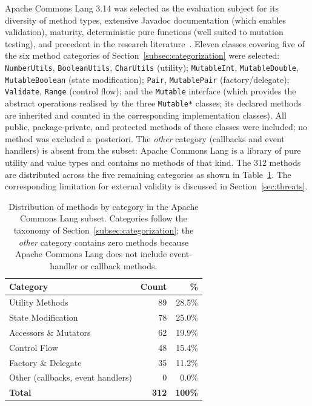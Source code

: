 \documentclass[11pt]{article}
\begin{document}
Apache Commons Lang 3.14 was selected as the evaluation subject for its diversity of method types, extensive Javadoc documentation (which enables validation), maturity, deterministic pure functions (well suited to mutation testing), and precedent in the research literature~\cite{pacheco2007randoop, fraser2011evosuite}. Eleven classes covering five of the six method categories of Section~\ref{subsec:categorization} were selected: \texttt{NumberUtils}, \texttt{BooleanUtils}, \texttt{CharUtils} (utility); \texttt{MutableInt}, \texttt{MutableDouble}, \texttt{MutableBoolean} (state modification); \texttt{Pair}, \texttt{MutablePair} (factory/delegate); \texttt{Validate}, \texttt{Range} (control flow); and the \texttt{Mutable} interface (which provides the abstract operations realised by the three \texttt{Mutable*} classes; its declared methods are inherited and counted in the corresponding implementation classes). All public, package-private, and protected methods of these classes were included; no method was excluded a~posteriori. The \emph{other} category (callbacks and event handlers) is absent from the subset: Apache Commons Lang is a library of pure utility and value types and contains no methods of that kind. The 312 methods are distributed across the five remaining categories as shown in Table~\ref{tab:method-distribution}. The corresponding limitation for external validity is discussed in Section~\ref{sec:threats}.

\begin{table}[ht]
\centering
\caption{Distribution of methods by category in the Apache Commons Lang subset. Categories follow the taxonomy of Section~\ref{subsec:categorization}; the \emph{other} category contains zero methods because Apache Commons Lang does not include event-handler or callback methods.}
\label{tab:method-distribution}
\begin{tabular}{lrr}
\toprule
\textbf{Category} & \textbf{Count} & \textbf{\%} \\
\midrule
Utility Methods & 89 & 28.5\% \\
State Modification & 78 & 25.0\% \\
Accessors \& Mutators & 62 & 19.9\% \\
Control Flow & 48 & 15.4\% \\
Factory \& Delegate & 35 & 11.2\% \\
Other (callbacks, event handlers) & 0 & 0.0\% \\
\midrule
\textbf{Total} & \textbf{312} & \textbf{100\%} \\
\bottomrule
\end{tabular}
\end{table}
\end{document}
